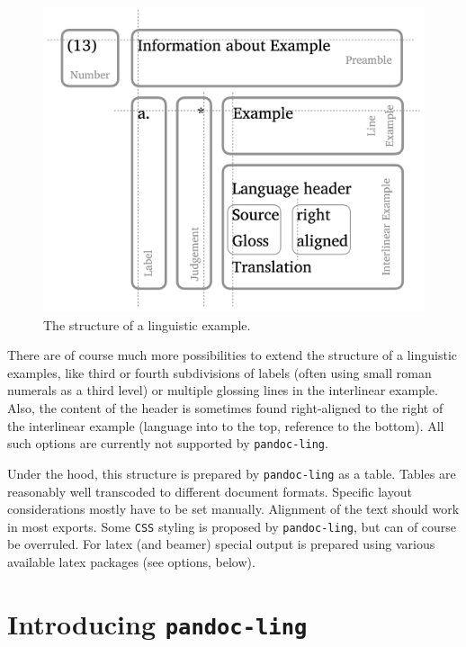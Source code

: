 \documentclass[
]{article}
\begin{document}
\begin{figure}
\centering
\includegraphics{figure/ExampleStructure.png}
\caption{The structure of a linguistic example.}
\end{figure}

There are of course much more possibilities to extend the structure of a
linguistic examples, like third or fourth subdivisions of labels (often
using small roman numerals as a third level) or multiple glossing lines
in the interlinear example. Also, the content of the header is sometimes
found right-aligned to the right of the interlinear example (language
into to the top, reference to the bottom). All such options are
currently not supported by \texttt{pandoc-ling}.

Under the hood, this structure is prepared by \texttt{pandoc-ling} as a
table. Tables are reasonably well transcoded to different document
formats. Specific layout considerations mostly have to be set manually.
Alignment of the text should work in most exports. Some \texttt{CSS}
styling is proposed by \texttt{pandoc-ling}, but can of course be
overruled. For latex (and beamer) special output is prepared using
various available latex packages (see options, below).

\hypertarget{introducing-pandoc-ling}{%
\section{\texorpdfstring{Introducing
\texttt{pandoc-ling}}{Introducing pandoc-ling}}\label{introducing-pandoc-ling}}
\end{document}
